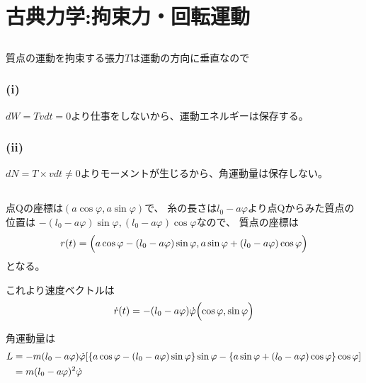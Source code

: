 \documentclass[../ap_2012.tex]{subfiles}
\begin{document}
\setcounter{chapter}{0}
\chapter{古典力学:拘束力・回転運動}
\section{}
質点の運動を拘束する張力\(T\)は運動の方向に垂直なので
\subsection*{(i)}
\(dW=T\dot vdt=0\)より仕事をしないから、運動エネルギーは保存する。
\subsection*{(ii)}
\(dN=T\times vdt\neq 0\)よりモーメントが生じるから、角運動量は保存しない。

\section{}
点Qの座標は\((a\cos\varphi,a\sin\varphi)\)で、
糸の長さは\(l_0-a\varphi\)より点Qからみた質点の位置は
\(-(l_0-a\varphi)\sin\varphi,(l_0-a\varphi)\cos\varphi\)なので、
質点の座標は
\begin{equation}\begin{aligned}[b]
    r(t) = \Bigl(a\cos\varphi-(l_0-a\varphi)\sin\varphi,a\sin\varphi+(l_0-a\varphi)\cos\varphi\Bigr)
\end{aligned}\end{equation}
となる。

これより速度ベクトルは
\begin{equation}\begin{aligned}[b]
    \dot{r}(t) =-(l_0-a\varphi)\dot{\varphi}\Bigl(\cos\varphi,\sin\varphi\Bigr)
\end{aligned}\end{equation}

角運動量は
\begin{equation}\begin{aligned}[b]
    L&=-m(l_0-a\varphi)\dot{\varphi}\qty[
        \qty{a\cos\varphi-(l_0-a\varphi)\sin\varphi}\sin\varphi
        -\qty{a\sin\varphi+(l_0-a\varphi)\cos\varphi}\cos\varphi]\\
    &=m(l_0-a\varphi)^2\dot{\varphi}
\end{aligned}\end{equation}
\end{document}

